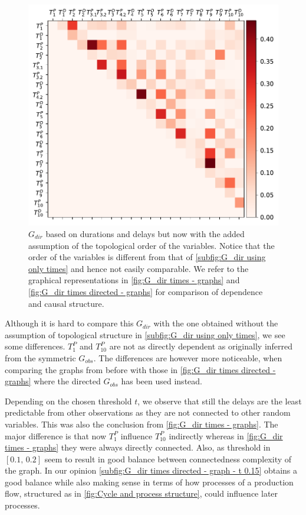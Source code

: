\documentclass[../Thesis.tex]{subfiles}
\begin{document}
\begin{figure}[ht]
    \centering
    \includegraphics[width = .8\linewidth]{figures/Cycle data/G_dir times - directed.pdf}
    \caption{$G_{dir}$ based on durations and delays but now with the added assumption of the topological order of the variables. Notice that the order of the variables is different from that of \autoref{subfig:G_dir using only times} and hence not easily comparable. We refer to the graphical representations in \autoref{fig:G_dir times - graphs} and \autoref{fig:G_dir times directed - graphs} for comparison of dependence and causal structure.}
    \label{fig:G_dir times - directed}
\end{figure}
Although it is hard to compare this $G_{dir}$ with the one obtained without the assumption of topological structure in \autoref{subfig:G_dir using only times}, we see some differences. $T^P_1$ and $T^P_{10}$ are not as directly dependent as originally inferred from the symmetric $G_{obs}$. The differences are however more noticeable, when comparing the graphs from before with those in \autoref{fig:G_dir times directed - graphs} where the directed $G_{obs}$ has been used instead.

Depending on the chosen threshold $t$, we observe that still the delays are the least predictable from other observations as they are not connected to other random variables. This was also the conclusion from \autoref{fig:G_dir times - graphs}. The major difference is that now $T^P_1$ influence $T^P_{10}$ indirectly whereas in \autoref{fig:G_dir times - graphs} they were always directly connected. Also, as threshold in $[0.1,\, 0.2]$ seem to result in good balance between connectedness complexity of the graph. In our opinion \autoref{subfig:G_dir times directed - graph - t 0.15} obtains a good balance while also making sense in terms of how processes of a production flow, structured as in \autoref{fig:Cycle and process structure}, could influence later processes.
\end{document}
